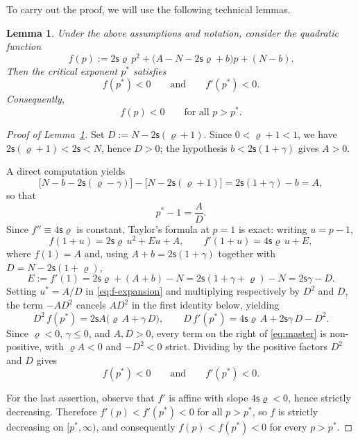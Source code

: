 \documentclass[12pt,reqno]{amsart}
\theoremstyle{plain}
\newtheorem{lem}[thm]{Lemma}
\theoremstyle{definition}
\theoremstyle{remark}
\numberwithin{equation}{section}
\newcommand{\ts}{\mathsf{s}}
\begin{document}
To carry out the proof, we will use the following technical lemmas.
\begin{lem}
\label{lem:f-p}
Under the above assumptions and notation, consider the quadratic function
\[
f(p):=2\ts \varrho\, p^{2}
+\bigl(A-N-2\ts\varrho+b\bigr)p
+(N-b).
\]
Then the critical exponent $p^{*}$ satisfies
\[
f(p^{*})<0
\qquad\text{and}\qquad
f'(p^{*})<0.
\]
Consequently,
\[
f(p)<0
\qquad\text{for all } p>p^{*}.
\]
\end{lem}
\begin{proof}[Proof of Lemma~\ref{lem:f-p}]
Set $D := N - 2\ts(\varrho+1)$. Since $0<\varrho+1<1$, we have $2\ts(\varrho+1)<2\ts<N$, hence $D>0$; the hypothesis $b<2\ts(1+\gamma)$ gives $A>0$.

A direct computation yields
\[
\bigl[N - b - 2\ts(\varrho-\gamma)\bigr] - \bigl[N - 2\ts(\varrho+1)\bigr] = 2\ts(1+\gamma)-b = A,
\]
so that
\begin{equation}\label{eq:pstar-1}
p^{*} - 1 = \frac{A}{D}.
\end{equation}
Since $f''\equiv 4\ts\varrho$ is constant, Taylor's formula at $p=1$ is exact: writing $u = p-1$,
\begin{equation}\label{eq:f-expansion}
f(1+u) = 2\ts\varrho\, u^{2} + E u + A,
\qquad
f'(1+u) = 4\ts\varrho\, u + E,
\end{equation}
where $f(1)=A$ and, using $A+b = 2\ts(1+\gamma)$ together with $D = N-2\ts(1+\varrho)$,
\[
E := f'(1) = 2\ts\varrho + (A+b) - N = 2\ts(1+\gamma+\varrho) - N = 2\ts\gamma - D.
\]
Setting $u^{*} = A/D$ in \eqref{eq:f-expansion} and multiplying respectively by $D^{2}$ and $D$, the term $-AD^{2}$ cancels $AD^{2}$ in the first identity below, yielding
\begin{equation}\label{eq:master}
D^{2}\, f(p^{*}) = 2\ts A\bigl(\varrho\, A + \gamma\, D\bigr),
\qquad
D\, f'(p^{*}) = 4\ts\varrho\, A + 2\ts\gamma\, D - D^{2}.
\end{equation}
Since $\varrho<0$, $\gamma\leq 0$, and $A,D>0$, every term on the right of \eqref{eq:master} is non-positive, with $\varrho A<0$ and $-D^{2}<0$ strict. Dividing by the positive factors $D^{2}$ and $D$ gives
\[
f(p^{*}) < 0 \qquad\text{and}\qquad f'(p^{*}) < 0.
\]

For the last assertion, observe that $f'$ is affine with slope $4\ts\varrho<0$, hence strictly decreasing. Therefore $f'(p) < f'(p^{*}) < 0$ for all $p>p^{*}$, so $f$ is strictly decreasing on $[p^{*},\infty)$, and consequently $f(p) < f(p^{*}) < 0$ for every $p > p^{*}$.
\end{proof}
\end{document}
